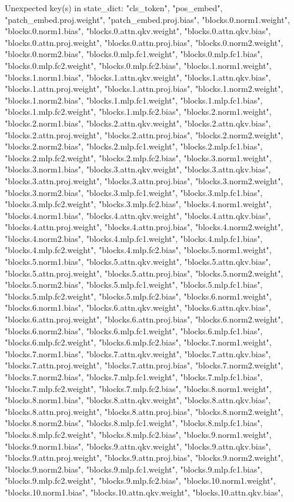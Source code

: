 	Unexpected key(s) in state_dict: "cls_token", "pos_embed", "patch_embed.proj.weight", "patch_embed.proj.bias", "blocks.0.norm1.weight", "blocks.0.norm1.bias", "blocks.0.attn.qkv.weight", "blocks.0.attn.qkv.bias", "blocks.0.attn.proj.weight", "blocks.0.attn.proj.bias", "blocks.0.norm2.weight", "blocks.0.norm2.bias", "blocks.0.mlp.fc1.weight", "blocks.0.mlp.fc1.bias", "blocks.0.mlp.fc2.weight", "blocks.0.mlp.fc2.bias", "blocks.1.norm1.weight", "blocks.1.norm1.bias", "blocks.1.attn.qkv.weight", "blocks.1.attn.qkv.bias", "blocks.1.attn.proj.weight", "blocks.1.attn.proj.bias", "blocks.1.norm2.weight", "blocks.1.norm2.bias", "blocks.1.mlp.fc1.weight", "blocks.1.mlp.fc1.bias", "blocks.1.mlp.fc2.weight", "blocks.1.mlp.fc2.bias", "blocks.2.norm1.weight", "blocks.2.norm1.bias", "blocks.2.attn.qkv.weight", "blocks.2.attn.qkv.bias", "blocks.2.attn.proj.weight", "blocks.2.attn.proj.bias", "blocks.2.norm2.weight", "blocks.2.norm2.bias", "blocks.2.mlp.fc1.weight", "blocks.2.mlp.fc1.bias", "blocks.2.mlp.fc2.weight", "blocks.2.mlp.fc2.bias", "blocks.3.norm1.weight", "blocks.3.norm1.bias", "blocks.3.attn.qkv.weight", "blocks.3.attn.qkv.bias", "blocks.3.attn.proj.weight", "blocks.3.attn.proj.bias", "blocks.3.norm2.weight", "blocks.3.norm2.bias", "blocks.3.mlp.fc1.weight", "blocks.3.mlp.fc1.bias", "blocks.3.mlp.fc2.weight", "blocks.3.mlp.fc2.bias", "blocks.4.norm1.weight", "blocks.4.norm1.bias", "blocks.4.attn.qkv.weight", "blocks.4.attn.qkv.bias", "blocks.4.attn.proj.weight", "blocks.4.attn.proj.bias", "blocks.4.norm2.weight", "blocks.4.norm2.bias", "blocks.4.mlp.fc1.weight", "blocks.4.mlp.fc1.bias", "blocks.4.mlp.fc2.weight", "blocks.4.mlp.fc2.bias", "blocks.5.norm1.weight", "blocks.5.norm1.bias", "blocks.5.attn.qkv.weight", "blocks.5.attn.qkv.bias", "blocks.5.attn.proj.weight", "blocks.5.attn.proj.bias", "blocks.5.norm2.weight", "blocks.5.norm2.bias", "blocks.5.mlp.fc1.weight", "blocks.5.mlp.fc1.bias", "blocks.5.mlp.fc2.weight", "blocks.5.mlp.fc2.bias", "blocks.6.norm1.weight", "blocks.6.norm1.bias", "blocks.6.attn.qkv.weight", "blocks.6.attn.qkv.bias", "blocks.6.attn.proj.weight", "blocks.6.attn.proj.bias", "blocks.6.norm2.weight", "blocks.6.norm2.bias", "blocks.6.mlp.fc1.weight", "blocks.6.mlp.fc1.bias", "blocks.6.mlp.fc2.weight", "blocks.6.mlp.fc2.bias", "blocks.7.norm1.weight", "blocks.7.norm1.bias", "blocks.7.attn.qkv.weight", "blocks.7.attn.qkv.bias", "blocks.7.attn.proj.weight", "blocks.7.attn.proj.bias", "blocks.7.norm2.weight", "blocks.7.norm2.bias", "blocks.7.mlp.fc1.weight", "blocks.7.mlp.fc1.bias", "blocks.7.mlp.fc2.weight", "blocks.7.mlp.fc2.bias", "blocks.8.norm1.weight", "blocks.8.norm1.bias", "blocks.8.attn.qkv.weight", "blocks.8.attn.qkv.bias", "blocks.8.attn.proj.weight", "blocks.8.attn.proj.bias", "blocks.8.norm2.weight", "blocks.8.norm2.bias", "blocks.8.mlp.fc1.weight", "blocks.8.mlp.fc1.bias", "blocks.8.mlp.fc2.weight", "blocks.8.mlp.fc2.bias", "blocks.9.norm1.weight", "blocks.9.norm1.bias", "blocks.9.attn.qkv.weight", "blocks.9.attn.qkv.bias", "blocks.9.attn.proj.weight", "blocks.9.attn.proj.bias", "blocks.9.norm2.weight", "blocks.9.norm2.bias", "blocks.9.mlp.fc1.weight", "blocks.9.mlp.fc1.bias", "blocks.9.mlp.fc2.weight", "blocks.9.mlp.fc2.bias", "blocks.10.norm1.weight", "blocks.10.norm1.bias", "blocks.10.attn.qkv.weight", "blocks.10.attn.qkv.bias", 